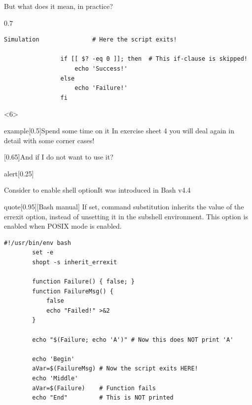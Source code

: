 \begin{frame}[fragile]{But what does it mean, in practice?}
\begin{overlayarea}{\textwidth}{0.7\textheight}
\begin{onlyenv}
\begin{lstlisting}[style=myBash]
                Simulation               # Here the script exits!

                if [[ $? -eq 0 ]]; then  # This if-clause is skipped!
                    echo 'Success!'
                else
                    echo 'Failure!'
                fi
            \end{lstlisting}
        \end{onlyenv}
        \begin{onlyenv}<6>
            \large
            \begin{varblock}{example}[0.5\textwidth]{Spend some time on it}
                In exercise sheet 4 you will deal again in detail with some corner cases!
            \end{varblock}
            \begin{varblock}{}[0.65\textwidth]{And if I do not want to use it?}
                \large {}
            \end{varblock}
            \vspace*{-1mm}
            \begin{varblock}{alert}[0.25\textwidth]{}
            \end{varblock}
        \end{onlyenv}
    \end{overlayarea}
\end{frame}
\begin{frame}[fragile]{Consider to enable \;\; shell option}{It was introduced in Bash v4.4}
    \vspace{-3mm}
    \begin{varblock}{quote}[0.95\textwidth]{}[Bash manual]
        If set, command substitution inherits the value of the errexit option, instead of unsetting it in the subshell environment.
        This option is enabled when POSIX mode is enabled.
    \end{varblock}
    \begin{lstlisting}[style=myBash]
        #!/usr/bin/env bash
        set -e
        shopt -s inherit_errexit

        function Failure() { false; }
        function FailureMsg() {
            false
            echo "Failed!" >&2
        }

        echo "$(Failure; echo 'A')" # Now this does NOT print 'A'

        echo 'Begin'
        aVar=$(FailureMsg) # Now the script exits HERE!
        echo 'Middle'
        aVar=$(Failure)    # Function fails
        echo "End"         # This is NOT printed
    \end{lstlisting}
\end{frame}
